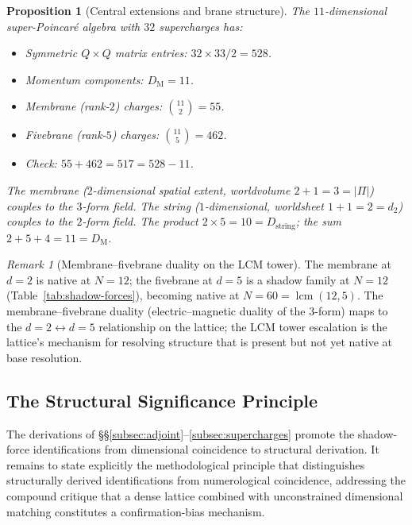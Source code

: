 \documentclass[11pt,a4paper]{article}
\newtheorem{proposition}[theorem]{Proposition}
\theoremstyle{definition}
\theoremstyle{remark}
\newtheorem{remark}[theorem]{Remark}
\DeclareMathOperator{\lcm}{lcm}
\begin{document}
\begin{proposition}[Central extensions and brane structure]\label{prop:central-ext}
The $11$-dimensional super-Poincar\'e algebra with $32$ supercharges has:
\begin{itemize}[leftmargin=*]
\item Symmetric $Q \times Q$ matrix entries: $32 \times 33/2 = 528$.
\item Momentum components: $D_{\mathrm{M}} = 11$.
\item Membrane (rank-$2$) charges: $\binom{11}{2} = 55$.
\item Fivebrane (rank-$5$) charges: $\binom{11}{5} = 462$.
\item Check: $55 + 462 = 517 = 528 - 11$. \checkmark
\end{itemize}
The membrane ($2$-dimensional spatial extent, worldvolume $2+1 = 3 = |\Pi|$) couples to the $3$-form field. The string ($1$-dimensional, worldsheet $1+1 = 2 = d_{2}$) couples to the $2$-form field. The product $2 \times 5 = 10 = D_{\mathrm{string}}$; the sum $2 + 5 + 4 = 11 = D_{\mathrm{M}}$.
\end{proposition}

\begin{remark}[Membrane--fivebrane duality on the LCM tower]
The membrane at $d = 2$ is native at $N = 12$; the fivebrane at $d = 5$ is a shadow family at $N = 12$ (Table~\ref{tab:shadow-forces}), becoming native at $N = 60 = \lcm(12,5)$. The membrane--fivebrane duality (electric--magnetic duality of the $3$-form) maps to the $d=2 \leftrightarrow d=5$ relationship on the lattice; the LCM tower escalation is the lattice's mechanism for resolving structure that is present but not yet native at base resolution.
\end{remark}

\subsection{The Structural Significance Principle}\label{subsec:structural-significance}

The derivations of \S\S\ref{subsec:adjoint}--\ref{subsec:supercharges} promote the shadow-force identifications from dimensional coincidence to structural derivation. It remains to state explicitly the methodological principle that distinguishes structurally derived identifications from numerological coincidence, addressing the compound critique that a dense lattice combined with unconstrained dimensional matching constitutes a confirmation-bias mechanism.
\end{document}
